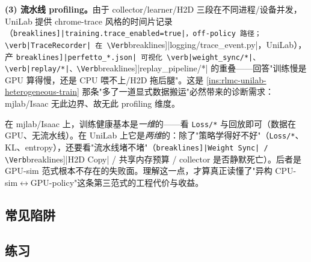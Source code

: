 \textbf{(3) 流水线 profiling。}由于 collector/learner/H2D 三段在不同进程/设备并发，UniLab 提供 chrome-trace 风格的时间片记录（\Verb[breaklines]|training.trace_enabled=true|，off-policy 路径；\verb|TraceRecorder| 在 \Verb[breaklines]|logging/trace_event.py|，UniLab），产 \Verb[breaklines]|perfetto_*.json| 可视化 \verb|weight_sync/*|、\verb|replay/*|、\Verb[breaklines]|replay_pipeline/*| 的重叠——回答"训练慢是 GPU 算得慢，还是 CPU 喂不上/H2D 拖后腿"。这是 \cref{ins:rlmc-unilab-heterogeneous-train} 那条"多了一道显式数据搬运"必然带来的诊断需求：mjlab/Isaac 无此边界、故无此 profiling 维度。

\begin{insight}\label{ins:rlmc-unilab-two-axes}
在 mjlab/Isaac 上，训练健康基本是\emph{一维}的——看 \verb|Loss/*| 与回放即可（数据在 GPU、无流水线）。在 UniLab 上它是\emph{两维}的：除了"策略学得好不好"（\verb|Loss/*|、KL、entropy），还要看"流水线堵不堵"（\Verb[breaklines]|Weight Sync| / \Verb[breaklines]|H2D Copy| / 共享内存预算 / collector 是否静默死亡）。后者是 GPU-sim 范式根本不存在的失败面。理解这一点，才算真正读懂了"异构 CPU-sim$\leftrightarrow$GPU-policy"这条第三范式的工程代价与收益。
\end{insight}

\subsection{常见陷阱}


\subsection{练习}

\begin{practice}[端到端流程]
\end{practice}

